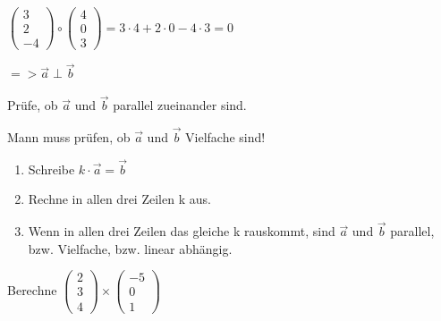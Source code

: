 \documentclass[paper=a6,landscape,ngerman,twoside=true,fontsize=12pt]{scrartcl}
\begin{document}
\begin{antwort}
	
	$\left(\begin{array}{c} 3 \\ 2 \\ -4\end{array} \right) \circ \left(\begin{array}{c} 4 \\ 0 \\ 3\end{array} \right)= 3 \cdot 4 + 2 \cdot 0 -4\cdot 3=0$
	
	$=> \vec{a} \perp \vec{b}$
	
\end{antwort}	
\begin{frage}
	\LARGE
	Prüfe, ob $\vec{a}$ und  $\vec{b}$ 
	parallel zueinander sind.
\end{frage}
\begin{antwort}
	
	Mann muss prüfen, ob $\vec{a}$ und  $\vec{b}$ Vielfache sind!
	\begin{enumerate}
		\item Schreibe $k \cdot \vec{a}= \vec{b}$
		\item Rechne in allen drei Zeilen k aus.			
		\item Wenn in allen drei Zeilen das gleiche k rauskommt, sind $\vec{a}$ und $\vec{b}$
		parallel, bzw. Vielfache, bzw. linear abhängig.	
	\end{enumerate}	
	
\end{antwort}	
\begin{frage}

	Berechne  $\left(\begin{array}{c} 2 \\ 3 \\ 4\end{array} \right) \times \left(\begin{array}{c} -5 \\ 0 \\ 1\end{array} \right)$ 
	
\end{frage}
\end{document}
